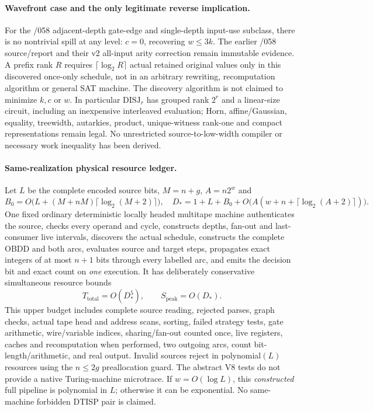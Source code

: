\documentclass[11pt]{article}
\begin{document}
\paragraph{Wavefront case and the only legitimate reverse implication.}
For the /058 adjacent-depth gate-edge and single-depth input-use
subclass, there is no nontrivial spill at any level:
$c=0$, recovering $w\le3k$. The earlier /058 source/report and
their v2 all-input arity correction remain immutable evidence.
A prefix rank $R$ requires
$\lceil\log_2R\rceil$ actual retained original values only in this
discovered once-only schedule, not in an arbitrary rewriting,
recomputation algorithm or general SAT machine. The discovery
algorithm is not claimed to minimize $k,c$ or $w$.
In particular $\mathrm{DISJ}_r$ has grouped rank $2^r$ and a
linear-size circuit, including an inexpensive interleaved evaluation;
Horn, affine/Gaussian, equality, treewidth, autarkies, product,
unique-witness rank-one and compact representations remain legal.
No unrestricted source-to-low-width compiler or necessary work
inequality has been derived.

\paragraph{Same-realization physical resource ledger.}
Let $L$ be the complete encoded source bits, $M=n+g$,
$A=n2^w$ and
\[
B_0=O\bigl(L+(M+nM)\lceil\log_2(M+2)\rceil\bigr),
\quad
D_*=1+L+B_0+
 O\bigl(A(w+n+\lceil\log_2(A+2)\rceil)\bigr).
\]
One fixed ordinary deterministic locally headed multitape machine
authenticates the source, checks every operand and cycle, constructs
depths, fan-out and last-consumer live intervals, discovers the
actual schedule, constructs the complete OBDD and both arcs, evaluates
source and target steps, propagates exact integers of at most $n+1$
bits through every labelled arc, and emits the decision bit and
exact count on \emph{one} execution. It has deliberately conservative
simultaneous resource bounds
\[
T_{\mathrm{total}}=O(D_*^5),\qquad
S_{\mathrm{peak}}=O(D_*).
\]
This upper budget includes complete source reading, rejected parses,
graph checks, actual tape head and address scans, sorting, failed
strategy tests, gate arithmetic, wire/variable indices, sharing/fan-out
counted once, live registers, caches and recomputation when performed,
two outgoing arcs, count bit-length/arithmetic, and real output.
Invalid sources reject in polynomial$(L)$ resources using the
$n\le2g$ preallocation guard. The abstract V8 tests do not provide
a native Turing-machine microtrace. If $w=O(\log L)$, this
\emph{constructed} full pipeline is polynomial in $L$; otherwise
it can be exponential. No same-machine forbidden DTISP pair is claimed.
\end{document}
